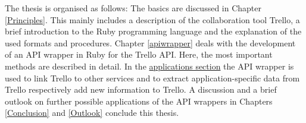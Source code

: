 The thesis is organised as follows: The basics are discussed in Chapter \ref{Principles}. This mainly includes a description of the collaboration tool Trello, a brief introduction to the Ruby programming language and the explanation of the used formats and procedures. Chapter \ref{apiwrapper} deals with the development of an API wrapper in Ruby for the Trello API. Here, the most important methods are described in detail. In the \hyperref[applications]{applications section} the API wrapper is used to link Trello to other services and to extract application-specific data from Trello respectively add new information to Trello. A discussion and a brief outlook on further possible applications of the API wrappers in Chapters \ref{Conclusion} and \ref{Outlook} conclude this thesis.